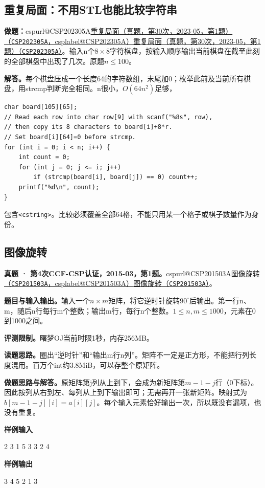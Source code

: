 \documentclass[UTF8,11pt,a4paper,fontset=none]{ctexart}
\makeatletter
\newcommand{\csp}[2]{\ifcsname cspurl@#1\endcsname\href{\csname cspurl@#1\endcsname}{#2（\texttt{#1}，\csname csplabel@#1\endcsname）}\else\href{https://oj.shumeng.tech/p/#1}{#2（\texttt{#1}）}\fi}
\makeatother
\begin{document}
\subsection{重复局面：不用STL也能比较字符串}

\noindent\textbf{做题：}\csp{CSP202305A}{重复局面（真题，第30次，2023-05，第1题）}。输入n个$8\times8$字符棋盘，按输入顺序输出当前棋盘在截至此刻的全部棋盘中出现了几次。原题$n\le100$。

\noindent\textbf{解答。}每个棋盘压成一个长度64的字符数组，末尾加0；枚举此前及当前所有棋盘，用strcmp判断完全相同。n很小，$O(64n^2)$足够，
\par\noindent\begin{minipage}{\linewidth}
\begin{lstlisting}
char board[105][65];
// Read each row into char row[9] with scanf("%8s", row),
// then copy its 8 characters to board[i]+8*r.
// Set board[i][64]=0 before strcmp.
for (int i = 0; i < n; i++) {
    int count = 0;
    for (int j = 0; j <= i; j++)
        if (strcmp(board[i], board[j]) == 0) count++;
    printf("%d\n", count);
}
\end{lstlisting}
\end{minipage}\par
包含\texttt{<cstring>}。比较必须覆盖全部64格，不能只用某一个格子或棋子数量作为身份。

\subsection{图像旋转}
\textbf{真题 · 第4次CCF-CSP认证，2015-03，第1题。}\csp{CSP201503A}{图像旋转}。

\noindent\textbf{题目与输入输出。}输入一个$n\times m$矩阵，将它逆时针旋转$90^\circ$后输出。第一行n、m，随后n行每行m个整数；输出m行，每行n个整数。$1\le n,m\le1000$，元素在0到1000之间。

\noindent\textbf{评测限制。}曙梦OJ当前时限1秒，内存256MB。

\noindent\textbf{读题思路。}圈出“逆时针”和“输出m行n列”。矩阵不一定是正方形，不能把行列长度混用。百万个int约3.8MiB，可以存整个原矩阵。

\noindent\textbf{做题思路与解答。}原矩阵第j列从上到下，会成为新矩阵第$m-1-j$行（0下标）。因此按列从右到左、每列从上到下输出即可；无需再开一张新矩阵。映射式为$b[m-1-j][i]=a[i][j]$。每个输入元素恰好输出一次，所以既没有漏项，也没有重复。
\begin{tcolorbox}[samplebox,title={输入输出样例}]
\textbf{样例输入}
\begin{Sample}
2 3
1 5 3
3 2 4
\end{Sample}
\tcblower
\textbf{样例输出}
\begin{Sample}
3 4
5 2
1 3
\end{Sample}
\end{tcolorbox}
\end{document}
